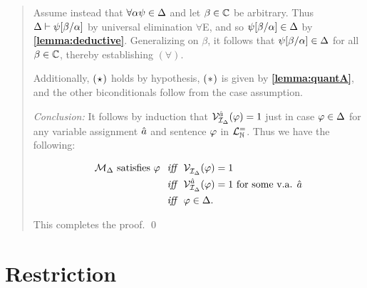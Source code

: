 \begin{quote}
  Assume instead that $\forall \alpha\psi\in\Delta$ and let $\beta\in\mathbb{C}$ be arbitrary.
  Thus $\Delta\vdash\psi[\beta/\alpha]$ by universal elimination $\forall$E, and so $\psi[\beta/\alpha]\in\Delta$ by \textbf{\ref{lemma:deductive}}.
  Generalizing on $\beta$, it follows that $\psi[\beta/\alpha]\in\Delta$ for all $\beta\in\mathbb{C}$, thereby establishing $(\forall)$.

  Additionally, $(\hspace{.7pt}\star\hspace{.7pt})$ holds by hypothesis, $(\hspace{.7pt}\ast\hspace{.7pt})$ is given by \textbf{\ref{lemma:quantA}}, and the other biconditionals follow from the case assumption.

  \textit{Conclusion:}
  It follows by induction that $\mathcal{V}_{\mathcal{I}_{\Delta}}^{\hat{a}}(\varphi)=1$ just in case $\varphi\in\Delta$ for any variable assignment $\hat{a}$ and sentence $\varphi$ in $\mathcal{L}^{=}_{\mathbb{N}}$. 
  Thus we have the following:

  \vspace{-.2in}
  \begin{align*}
    \mathcal{M}_{\Delta} \text{ satisfies } \varphi &\textit{ ~iff~ } \mathcal{V}_{\mathcal{I}_{\Delta}}^{}(\varphi)=1\\
    &\textit{ ~iff~ } \mathcal{V}_{\mathcal{I}_{\Delta}}^{\hat{a}}(\varphi)=1 \text{ for some v.a. } \hat{a}\\
      &\textit{ ~iff~ } \varphi\in\Delta.
  \end{align*}

  This completes the proof.
  \qed
\end{quote}





\section{Restriction}%
  \label{sub:Restriction}
 
